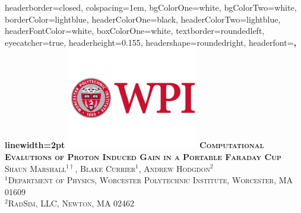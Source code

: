 \documentclass[landscape,archE1,fontscale=0.285]{baposter} %
\begin{document}
\begin{poster}
{
headerborder=closed, %
colspacing=1em, %
bgColorOne=white, %
bgColorTwo=white, %
borderColor=lightblue, %
headerColorOne=black, %
headerColorTwo=lightblue, %
headerFontColor=white, %
boxColorOne=white, %
textborder=roundedleft, %
eyecatcher=true, %
headerheight=0.155\textheight, %
headershape=roundedright, %
headerfont=\Large\bf\textsc, %
linewidth=2pt %
}
{\includegraphics[height=12em]{figures/Inst-Prim-FulClr.png}} %
{\bf\textsc{Computational Evalutions of Proton Induced Gain in a Portable Faraday Cup}} %
{\textsc{Shaun Marshall$^{1\dag}$, Blake Currier$^1$, Andrew Hodgdon$^2$ \\$^1$Department of Physics, Worcester Polytechnic Institute, Worcester, MA 01609\\ $^2$RadSim, LLC, Newton, MA 02462}} \\ %


\end{poster}
\end{document}
